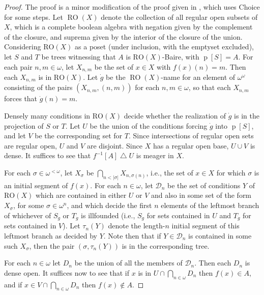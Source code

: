 \documentclass[fleqn, 11pt]{amsart}
\theoremstyle{plain}
\theoremstyle{definition}
\theoremstyle{remark}
\DeclareMathOperator{\p}{p}
\begin{document}
\begin{proof}
 The proof is a minor modification of the proof given in \cite{FenMagWoo}, which uses Choice for some steps. Let $\operatorname{RO}(X)$ denote the collection of all regular open subsets of $X$, which is a complete boolean algebra with negation given by the complement of the closure, and suprema given by the interior of the closure of the union. Considering $\mathrm{RO}(X)$ as a poset (under inclusion, with the emptyset excluded), let $S$ and $T$ be trees witnessing that $A$ is $\mathrm{RO}(X)$-Baire, with $\p[S] = A$. For each pair $n,m \in \omega$, let $X_{n,m}$ be the set of $x \in X$ with $f(x)(n) = m$. Then each $X_{n,m}$ is in $\mathrm{RO}(X)$. Let $\dot{g}$ be the $\operatorname{RO}(X)$-name for an element of $\omega^{\omega}$ consisting of the pairs $(X_{n,m}, (n,m))$ for each $n, m \in \omega$, so that each $X_{n,m}$ forces that $\dot{g}(n) = m$. 
 
Densely many conditions in $\mathrm{RO}(X)$ decide whether the realization of $\dot{g}$  is in the projection of $S$ or $T$. Let $U$ be the union of the conditions forcing $\dot{g}$ into $\p[S]$, and let $V$ be the corresponding set for $T$. Since intersections of regular open sets are regular open, $U$ and $V$ are disjoint. Since $X$ has a regular open base, $U \cup V$ is dense. It suffices to see that $f^{-1}[A] \bigtriangleup U$ is meager in $X$. 
 
 
 For each $\sigma \in \omega^{<\omega}$, let $X_{\sigma}$ be $\bigcap_{n < |\sigma|}X_{n,\sigma(n)}$, i.e., the set of $x \in X$ for which $\sigma$ is an initial segment of $f(x)$. For each $n \in \omega$, let $\mathcal{D}_{n}$ be the set of conditions $Y$ of $\mathrm{RO}(X)$ which are contained in either $U$ or $V$ and also in some set of the form $X_{\sigma}$, for some $\sigma \in \omega^{n}$, and which decide the first $n$ elements of the leftmost branch of whichever of $S_{\dot{g}}$ or $T_{\dot{g}}$ is illfounded (i.e., $S_{\dot{g}}$ for sets contained in $U$ and $T_{\dot{g}}$ for sets contained in $V$). Let $\tau_{n}(Y)$ denote the length-$n$ initial segment of this leftmost branch as decided by $Y$. Note then that if $Y \in \mathcal{D}_{n}$ is contained in some such $X_{\sigma}$, then the pair $(\sigma,\tau_{n}(Y))$ is in the corresponding tree.  
 
 For each $n \in\omega$ let $D_{n}$ be the union of all the members of $\mathcal{D}_{n}$. Then each $D_{n}$ is dense open.  It suffices now to see that if $x$ is in $U \cap \bigcap_{n \in \omega}D_{n}$ then $f(x) \in A$, and if $x \in V \cap \bigcap_{n \in \omega}D_{n}$ then $f(x) \not\in A$. 
 

\end{proof}
\end{document}
